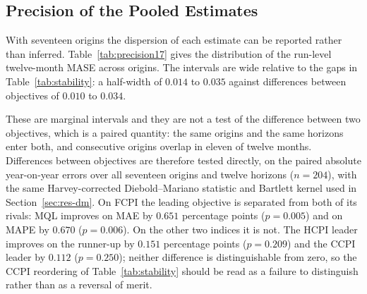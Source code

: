 \documentclass[12pt]{article}
\begin{document}
\subsection{Precision of the Pooled Estimates}
\label{sec:res-precision}

With seventeen origins the dispersion of each estimate can be reported
rather than inferred. Table~\ref{tab:precision17} gives the distribution of the
run-level twelve-month MASE across origins. The intervals are wide relative to
the gaps in Table~\ref{tab:stability}: a half-width of $0.014$ to $0.035$ against
differences between objectives of $0.010$ to $0.034$.

These are marginal intervals and they are not a test of the difference between
two objectives, which is a paired quantity: the same origins and the same
horizons enter both, and consecutive origins overlap in eleven of twelve
months. Differences between objectives are therefore tested directly, on the
paired absolute year-on-year errors over all seventeen origins and twelve
horizons ($n = 204$), with the same Harvey-corrected Diebold--Mariano statistic
and Bartlett kernel used in Section~\ref{sec:res-dm}. On FCPI the leading
objective is separated from both of its rivals: MQL improves on MAE by $0.651$
percentage points ($p = 0.005$) and on MAPE by $0.670$ ($p = 0.006$). On the
other two indices it is not. The HCPI leader improves on the runner-up by
$0.151$ percentage points ($p = 0.209$) and the CCPI leader by $0.112$
($p = 0.250$); neither difference is distinguishable from zero, so the CCPI
reordering of Table~\ref{tab:stability} should be read as a failure to
distinguish rather than as a reversal of merit.
\end{document}
